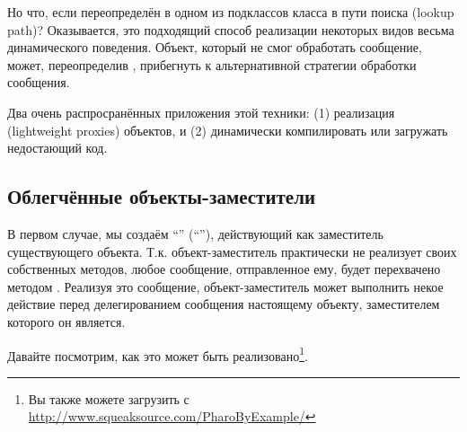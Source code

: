 \documentclass[a4paper,10pt,twoside]{book}
\begin{document}
Но что, если  переопределён в одном из подклассов класса  в пути поиска (lookup path)?
Оказывается, это подходящий способ реализации некоторых видов весьма динамического поведения. Объект, который не смог обработать сообщение, может, переопределив , прибегнуть к альтернативной стратегии обработки сообщения.

Два очень распросранённых приложения этой техники: (1) реализация  (lightweight proxies) объектов, и (2) динамически компилировать или загружать недостающий код.

\subsection{Облегчённые объекты-заместители}

В первом случае, мы создаём ``'' (``''), действующий как заместитель существующего объекта.
Т.к. объект-заместитель практически не реализует своих собственных методов, любое сообщение, отправленное ему, будет перехвачено методом  . Реализуя это сообщение, объект-заместитель может выполнить некое действие перед делегированием сообщения настоящему объекту, заместителем которого он является.

Давайте посмотрим, как это может быть реализовано\footnote{Вы также можете загрузить  с \url{http://www.squeaksource.com/PharoByExample/}}.
\end{document}
